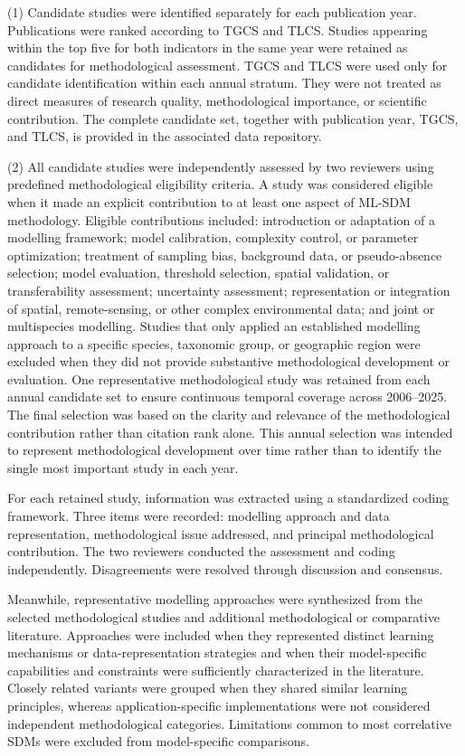 \documentclass[authoryear,preprint,review,12pt]{elsarticle}
\begin{document}
(1) Candidate studies were identified separately for each publication year. Publications were ranked according to TGCS and TLCS. Studies appearing within the top five for both indicators in the same year were retained as candidates for methodological assessment. TGCS and TLCS were used only for candidate identification within each annual stratum. They were not treated as direct measures of research quality, methodological importance, or scientific contribution. The complete candidate set, together with publication year, TGCS, and TLCS, is provided in the associated data repository.

(2) All candidate studies were independently assessed by two reviewers using predefined methodological eligibility criteria. A study was considered eligible when it made an explicit contribution to at least one aspect of ML-SDM methodology. Eligible contributions included: introduction or adaptation of a modelling framework; model calibration, complexity control, or parameter optimization; treatment of sampling bias, background data, or pseudo-absence selection; model evaluation, threshold selection, spatial validation, or transferability assessment; uncertainty assessment; representation or integration of spatial, remote-sensing, or other complex environmental data; and joint or multispecies modelling. Studies that only applied an established modelling approach to a specific species, taxonomic group, or geographic region were excluded when they did not provide substantive methodological development or evaluation. One representative methodological study was retained from each annual candidate set to ensure continuous temporal coverage across 2006--2025. The final selection was based on the clarity and relevance of the methodological contribution rather than citation rank alone. This annual selection was intended to represent methodological development over time rather than to identify the single most important study in each year.

For each retained study, information was extracted using a standardized coding framework. Three items were recorded: modelling approach and data representation, methodological issue addressed, and principal methodological contribution. The two reviewers conducted the assessment and coding independently. Disagreements were resolved through discussion and consensus.

Meanwhile, representative modelling approaches were synthesized from the selected methodological studies and additional methodological or comparative literature. Approaches were included when they represented distinct learning mechanisms or data-representation strategies and when their model-specific capabilities and constraints were sufficiently characterized in the literature. Closely related variants were grouped when they shared similar learning principles, whereas application-specific implementations were not considered independent methodological categories. Limitations common to most correlative SDMs were excluded from model-specific comparisons.
\end{document}
